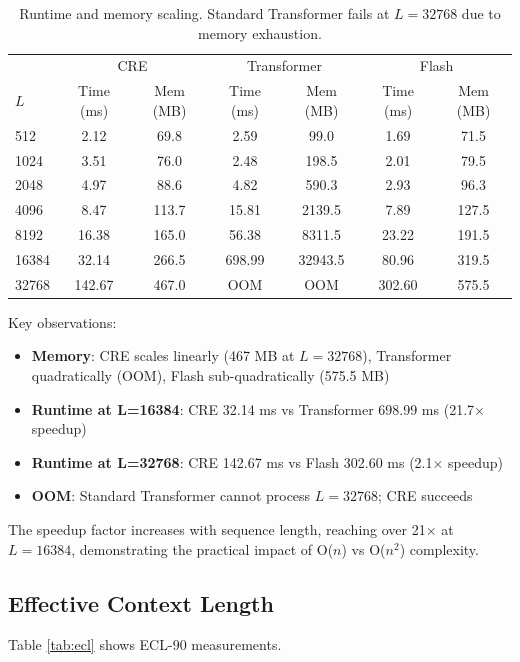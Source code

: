 \documentclass{article}
\begin{document}
\begin{table}[h]
\centering
\small
\begin{tabular}{lcccccc}
\toprule
& \multicolumn{2}{c}{CRE} & \multicolumn{2}{c}{Transformer} & \multicolumn{2}{c}{Flash} \\
$L$ & Time (ms) & Mem (MB) & Time (ms) & Mem (MB) & Time (ms) & Mem (MB) \\
\midrule
512 & 2.12 & 69.8 & 2.59 & 99.0 & 1.69 & 71.5 \\
1024 & 3.51 & 76.0 & 2.48 & 198.5 & 2.01 & 79.5 \\
2048 & 4.97 & 88.6 & 4.82 & 590.3 & 2.93 & 96.3 \\
4096 & 8.47 & 113.7 & 15.81 & 2139.5 & 7.89 & 127.5 \\
8192 & 16.38 & 165.0 & 56.38 & 8311.5 & 23.22 & 191.5 \\
16384 & 32.14 & 266.5 & 698.99 & 32943.5 & 80.96 & 319.5 \\
32768 & 142.67 & 467.0 & OOM & OOM & 302.60 & 575.5 \\
\bottomrule
\end{tabular}
\caption{Runtime and memory scaling. Standard Transformer fails at $L=32768$ due to memory exhaustion.}
\label{tab:scaling}
\end{table}

Key observations:
\begin{itemize}
\item \textbf{Memory}: CRE scales linearly (467 MB at $L=32768$), Transformer quadratically (OOM), Flash sub-quadratically (575.5 MB)
\item \textbf{Runtime at L=16384}: CRE 32.14 ms vs Transformer 698.99 ms (21.7$\times$ speedup)
\item \textbf{Runtime at L=32768}: CRE 142.67 ms vs Flash 302.60 ms (2.1$\times$ speedup)
\item \textbf{OOM}: Standard Transformer cannot process $L=32768$; CRE succeeds
\end{itemize}

The speedup factor increases with sequence length, reaching over 21$\times$ at $L=16384$, demonstrating the practical impact of O($n$) vs O($n^2$) complexity.

\subsection{Effective Context Length}

Table \ref{tab:ecl} shows ECL-90 measurements.
\end{document}

